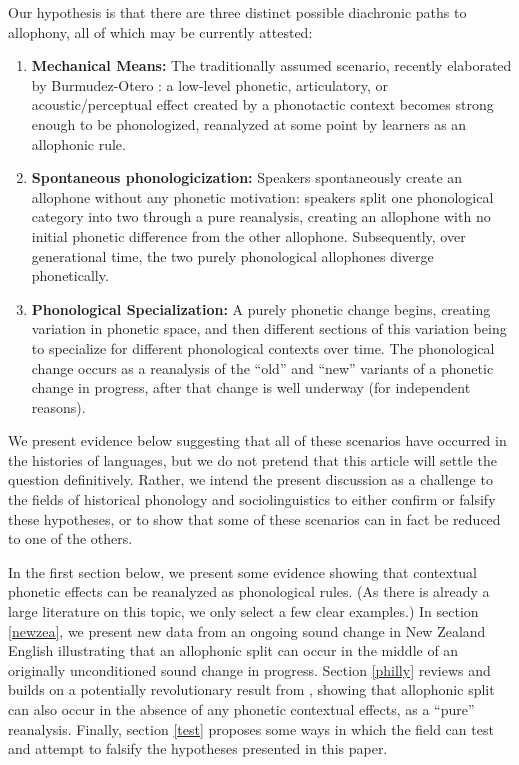 Our hypothesis is that there are three distinct possible diachronic paths to allophony, all of which may be currently attested:
\begin{enumerate}
    \item \textbf{Mechanical Means:} The traditionally assumed scenario, recently elaborated by Burmudez-Otero : a low-level phonetic, articulatory, or acoustic/perceptual effect created by a phonotactic context becomes strong enough to be phonologized, reanalyzed at some point by learners as an allophonic rule. 
    \item \textbf{Spontaneous phonologicization:} Speakers spontaneously create an allophone without any phonetic motivation: speakers split one phonological category into two through a pure reanalysis, creating an allophone with no initial phonetic difference from the other allophone. Subsequently, over generational time, the two purely phonological allophones diverge phonetically.
    \item \textbf{Phonological Specialization:} A purely phonetic change begins, creating variation in phonetic space, and then different sections of this variation being to specialize for different phonological contexts over time. The phonological change occurs as a reanalysis of the ``old'' and ``new'' variants of a phonetic change in progress, after that change is well underway (for independent reasons). \\
\end{enumerate}
\noindent We present evidence below suggesting that all of these scenarios have occurred in the histories of languages, but we do not pretend that this article will settle the question definitively. Rather, we intend the present discussion as a challenge to the fields of historical phonology and sociolinguistics to either confirm or falsify these hypotheses, or to show that some of these scenarios can in fact be reduced to one of the others.

In the first section below, we present some evidence showing that contextual phonetic effects can be reanalyzed as phonological rules. (As there is already a large literature on this topic, we only select a few clear examples.) In section \ref{newzea}, we present new data from an ongoing sound change in New Zealand English illustrating that an allophonic split can occur in the middle of an originally unconditioned sound change in progress. Section \ref{philly} reviews and builds on a potentially revolutionary result from \citet{fruehwald2013}, showing that allophonic split can also occur in the absence of any phonetic contextual effects, as a ``pure'' reanalysis. Finally, section \ref{test} proposes some ways in which the field can test and attempt to falsify the hypotheses presented in this paper.

